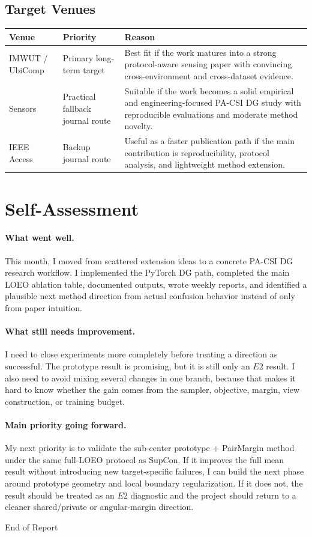\documentclass[11pt]{article}
\begin{document}
\subsection*{Target Venues}

\begin{longtable}{@{}p{1.25in}p{1.35in}p{3.55in}@{}}
\toprule
Venue & Priority & Reason \\
\midrule
\endhead
IMWUT / UbiComp & Primary long-term target & Best fit if the work matures into a strong protocol-aware sensing paper with convincing cross-environment and cross-dataset evidence. \\
Sensors & Practical fallback journal route & Suitable if the work becomes a solid empirical and engineering-focused PA-CSI DG study with reproducible evaluations and moderate method novelty. \\
IEEE Access & Backup journal route & Useful as a faster publication path if the main contribution is reproducibility, protocol analysis, and lightweight method extension. \\
\bottomrule
\end{longtable}

\section{Self-Assessment}

\paragraph{What went well.}
This month, I moved from scattered extension ideas to a concrete PA-CSI DG research workflow. I implemented the PyTorch DG path, completed the main LOEO ablation table, documented outputs, wrote weekly reports, and identified a plausible next method direction from actual confusion behavior instead of only from paper intuition.

\paragraph{What still needs improvement.}
I need to close experiments more completely before treating a direction as successful. The prototype result is promising, but it is still only an $E2$ result. I also need to avoid mixing several changes in one branch, because that makes it hard to know whether the gain comes from the sampler, objective, margin, view construction, or training budget.

\paragraph{Main priority going forward.}
My next priority is to validate the sub-center prototype + PairMargin method under the same full-LOEO protocol as SupCon. If it improves the full mean result without introducing new target-specific failures, I can build the next phase around prototype geometry and local boundary regularization. If it does not, the result should be treated as an $E2$ diagnostic and the project should return to a cleaner shared/private or angular-margin direction.

\vfill
\begin{center}
End of Report
\end{center}
\end{document}
